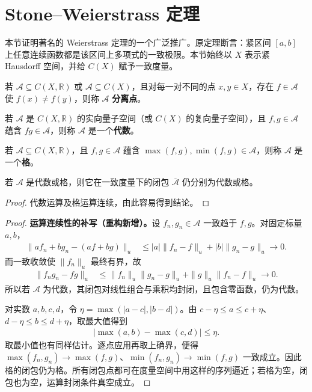\documentclass[../../main.tex]{subfiles}%
\begin{document}
\section{Stone--Weierstrass 定理}\label{section:ch04-stone-weierstrass}
本节证明著名的 Weierstrass 定理的一个广泛推广。原定理断言：紧区间 $[a,b]$ 上任意连续函数都是该区间上多项式的一致极限。本节始终以 $X$ 表示紧 Hausdorff 空间，并给 $C(X)$ 赋予一致度量。
\begin{definition}\label{definition:ch04-separating-algebra-lattice}
若 $\mathcal A\subseteq C(X,\mathbb R)$ 或 $\mathcal A\subseteq C(X)$，且对每一对不同的点 $x,y\in X$，存在 $f\in\mathcal A$ 使 $f(x)\ne f(y)$，则称 $\mathcal A$ \textbf{分离点}。

若 $\mathcal A$ 是 $C(X,\mathbb R)$ 的实向量子空间（或 $C(X)$ 的复向量子空间），且 $f,g\in\mathcal A$ 蕴含 $fg\in\mathcal A$，则称 $\mathcal A$ 是一个\textbf{代数}。

若 $\mathcal A\subseteq C(X,\mathbb R)$，且 $f,g\in\mathcal A$ 蕴含 $\max(f,g),\min(f,g)\in\mathcal A$，则称 $\mathcal A$ 是一个\textbf{格}。
\end{definition}
\begin{proposition}\label{proposition:ch04-algebra-lattice-closure}
若 $\mathcal A$ 是代数或格，则它在一致度量下的闭包 $\overline{\mathcal A}$ 仍分别为代数或格。
\end{proposition}
\begin{proof}
代数运算及格运算连续，由此容易得到结论。
\end{proof}
\begin{proof}
\textbf{运算连续性的补写（重构新增）。}设 $f_n,g_n\in\mathcal A$ 一致趋于 $f,g$。对固定标量 $a,b$，
\begin{align*}
\|af_n+bg_n-(af+bg)\|_u
&\le |a|\|f_n-f\|_u+|b|\|g_n-g\|_u\to0.
\end{align*}
而一致收敛使 $\|f_n\|_u$ 最终有界，故
\begin{align*}
\|f_ng_n-fg\|_u
&\le\|f_n\|_u\|g_n-g\|_u+\|g\|_u\|f_n-f\|_u\to0.
\end{align*}
所以若 $\mathcal A$ 为代数，其闭包对线性组合与乘积均封闭，且包含零函数，仍为代数。

对实数 $a,b,c,d$，令 $\eta=\max(|a-c|,|b-d|)$。由 $c-\eta\le a\le c+\eta$、$d-\eta\le b\le d+\eta$，取最大值得到
\begin{align*}
|\max(a,b)-\max(c,d)|\le\eta.
\end{align*}
取最小值也有同样估计。逐点应用再取上确界，便得 $\max(f_n,g_n)\to\max(f,g)$、$\min(f_n,g_n)\to\min(f,g)$ 一致成立。因此格的闭包仍为格。所有闭包点都可在度量空间中用这样的序列逼近；若格为空，闭包也为空，运算封闭条件真空成立。
\end{proof}
\end{document}
